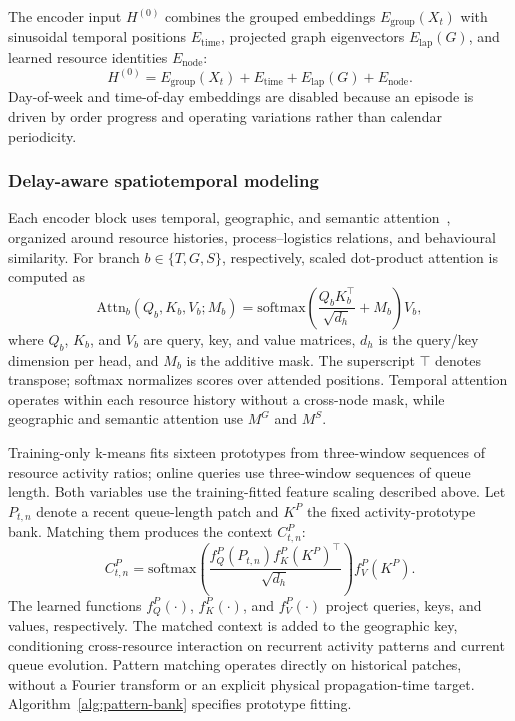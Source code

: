 \documentclass[a4paper,fleqn]{cas-dc}
\begin{document}
The encoder input $H^{(0)}$ combines the grouped embeddings $E_{\mathrm{group}}(X_t)$ with sinusoidal temporal positions $E_{\mathrm{time}}$, projected graph eigenvectors $E_{\mathrm{lap}}(G)$, and learned resource identities $E_{\mathrm{node}}$:
\begin{equation}
H^{(0)}=E_{\mathrm{group}}(X_t)+
E_{\mathrm{time}}+E_{\mathrm{lap}}(G)+E_{\mathrm{node}}.
\end{equation}
Day-of-week and time-of-day embeddings are disabled because an episode is driven by order progress and operating variations rather than calendar periodicity.

\subsubsection{Delay-aware spatiotemporal modeling}

Each encoder block uses temporal, geographic, and semantic attention~\cite{jiang2023pdformer}, organized around resource histories, process--logistics relations, and behavioural similarity. For branch $b\in\{T,G,S\}$, respectively, scaled dot-product attention is computed as
\begin{equation}
\mathrm{Attn}_{b}(Q_b,K_b,V_b;M_b)
=\mathrm{softmax}\!\left(
\frac{Q_bK_b^\top}{\sqrt{d_h}}+M_b
\right)V_b ,
\end{equation}
where $Q_b$, $K_b$, and $V_b$ are query, key, and value matrices, $d_h$ is the query/key dimension per head, and $M_b$ is the additive mask. The superscript $\top$ denotes transpose; softmax normalizes scores over attended positions. Temporal attention operates within each resource history without a cross-node mask, while geographic and semantic attention use $M^G$ and $M^S$.

Training-only k-means fits sixteen prototypes from three-window sequences of resource activity ratios; online queries use three-window sequences of queue length. Both variables use the training-fitted feature scaling described above. Let $P_{t,n}$ denote a recent queue-length patch and $K^P$ the fixed activity-prototype bank. Matching them produces the context $C^P_{t,n}$:
\begin{equation}
C^P_{t,n}=
\mathrm{softmax}\!\left(
\frac{f_Q^P(P_{t,n})f_K^P(K^P)^\top}{\sqrt{d_h}}
\right)f_V^P(K^P).
\end{equation}
The learned functions $f_Q^P(\cdot)$, $f_K^P(\cdot)$, and $f_V^P(\cdot)$ project queries, keys, and values, respectively. The matched context is added to the geographic key, conditioning cross-resource interaction on recurrent activity patterns and current queue evolution. Pattern matching operates directly on historical patches, without a Fourier transform or an explicit physical propagation-time target. Algorithm~\ref{alg:pattern-bank} specifies prototype fitting.
\end{document}
